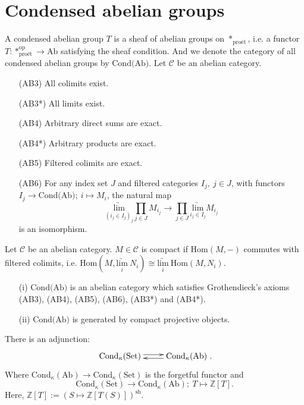 \documentclass[UTF8,12,a4paper]{ctexart}
\theoremstyle{definition}
\begin{document}
\newpage
\section{Condensed abelian groups}
\dfn 
A condensed abelian group $T$ is a sheaf of abelian groups on $*_{\text{pro\'et}}$, i.e. a functor $T:*_{\text{pro\'et}}^{\text{op}}\to \text{Ab}$ satisfying the sheaf condition. And we denote the category of all condensed abelian groups by $\text{Cond(Ab)}.$
 Let $\mathcal{C}$ be an abelian category.
~\
\begin{itemize}
	\item [(AB3)] All colimits exist.
	\item [(AB3*)]All limits exist.
	\item [(AB4)] Arbitrary direct sums are exact.
	\item [(AB4*)] Arbitrary products are exact.
	\item [(AB5)] Filtered colimits are exact.
	\item [(AB6)]  For any index set $J$ and filtered categories $I_j,\ j\in J$, with functors $I_j\rightarrow \text{Cond(Ab)};\  i\mapsto M_i$, the natural map
	$$
	\underset{(i_j\in I_j)_j}{\underrightarrow{\text{lim}}}\prod_{j\in J} M_{i_j}\longrightarrow \prod_{j\in J}\underset{i_j\in I_j}{\underrightarrow{\text{lim}}} M_{i_j}
	$$
	is an isomorphism.
\end{itemize}
\dfn
Let $\mathcal{C}$ be an abelian category. $M\in \mathcal{C}$ is compact if $\text{Hom}(M,-)$ commutes with filtered colimits, i.e. $\text{Hom}(M,\underset{i}{\underrightarrow{\text{lim}}}\ N_i)\cong \underset{i}{\underrightarrow{\text{lim}}}\ \text{Hom}(M,N_i).$

\thm
\begin{itemize}
	\item [(i)]$\text{Cond(Ab)}$ is an abelian category which satisfies Grothendieck's axioms (AB3), (AB4), (AB5), (AB6), (AB3*) and (AB4*).
	\item [(ii)]$\text{Cond(Ab)}$ is generated by compact projective objects.
\end{itemize}

\cor 
There is an adjunction:
$$
\xymatrix{\text{Cond}_\kappa (\text{Set}) \ar@<0.5ex>[r]
	& \text{Cond}_\kappa (\text{Ab})\ar@<0.5ex>[l]}.
$$
Where $\text{Cond}_\kappa (\text{Ab})\longrightarrow \text{Cond}_\kappa (\text{Set})$ is the forgetful functor and 
$$
\text{Cond}_\kappa (\text{Set})\longrightarrow \text{Cond}_\kappa (\text{Ab});\ T\mapsto \mathbb{Z}[T].
$$
Here, $\mathbb{Z}[T]:=(S\mapsto \mathbb{Z}[T(S)])^\text{sh}.$
\end{document}
